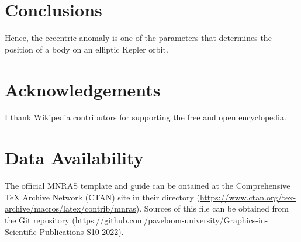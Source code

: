 \documentclass[fleqn,usenatbib]{mnras}
\begin{document}
\section{Conclusions}

Hence, the eccentric anomaly is one of the parameters that determines the
position of a body on an elliptic Kepler orbit.

\section*{Acknowledgements}

I thank Wikipedia contributors for supporting the free and open encyclopedia.

\section*{Data Availability}

The official MNRAS template and guide can be ontained at the
Comprehensive TeX Archive Network (CTAN) site in their directory
(\url{https://www.ctan.org/tex-archive/macros/latex/contrib/mnras}).
Sources of this file can be obtained from the Git repository
(\url{https://github.com/paveloom-university/Graphics-in-Scientific-Publications-S10-2022}).














\bsp %
\label{lastpage}
\end{document}
